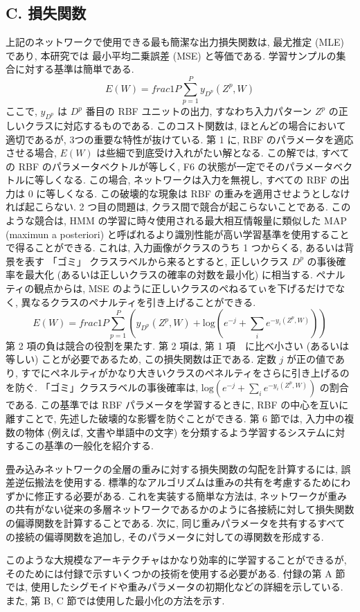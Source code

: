 \documentclass[twocolumn]{jarticle}     %
\begin{document}
\subsection{C. 損失関数}
上記のネットワークで使用できる最も簡潔な出力損失関数は, 最尤推定 (MLE) であり, 本研究では 最小平均二乗誤差 (MSE) と等価である.
学習サンプルの集合に対する基準は簡単である.
\begin{equation}
  E(W) = frac{1}{P}\sum_{p=1}^{P}y_{D^p}(Z^p,W)
\end{equation}
ここで, $y_{D^p}$ は $D^p$ 番目の RBF ユニットの出力, すなわち入力パターン $Z^p$ の正しいクラスに対応するものである.
このコスト関数は, ほとんどの場合において適切であるが, 3つの重要な特性が抜けている. 
第 1 に, RBF のパラメータを適応させる場合, $E(W)$ は些細で到底受け入れがたい解となる. この解では, すべての RBF のパラメータベクトルが等しく, F6 の状態が一定でそのパラメータベクトルに等しくなる.
この場合, ネットワークは入力を無視し, すべての RBF の出力は 0 に等しくなる. この破壊的な現象は RBF の重みを適用させようとしなければ起こらない.
 2 つ目の問題は, クラス間で競合が起こらないことである. このような競合は, HMM の学習に時々使用される最大相互情報量に類似した MAP (maximun a posteriori) と呼ばれるより識別性能が高い学習基準を使用することで得ることができる.
 これは, 入力画像がクラスのうち 1 つからくる, あるいは背景を表す 「ゴミ」 クラスラベルから来るとすると, 正しいクラス $D^p$ の事後確率を最大化 (あるいは正しいクラスの確率の対数を最小化) に相当する.
 ペナルティの観点からは, MSE のように正しいクラスのぺねるてぃを下げるだけでなく, 異なるクラスのペナルティを引き上げることができる.
 \begin{equation}
  E(W) = frac{1}{P} \sum_{p=1}^P (y_{D^p}(Z^p,W) + \mathrm{log}(e^{-j} + \sum_{i}e^{-y_i(Z^p,W)}))
 \end{equation}
 第 2 項の負は競合の役割を果たす.
 第 2 項は, 第 1 項　に比べ小さい (あるいは等しい) ことが必要であるため, この損失関数は正である.
 定数 $j$ が正の値であり, すでにペネルティがかなり大きいクラスのペネルティをさらに引き上げるのを防ぐ.
 「ゴミ」クラスラベルの事後確率は, $\mathrm{log}(e^{-j} + \sum_{i}e^{-y_i(Z^p,W)})$ の割合である.
 この基準では RBF パラメータを学習するときに, RBF の中心を互いに離すことで, 先述した破壊的な影響を防ぐことができる.
 第 6 節では, 入力中の複数の物体 (例えば, 文書や単語中の文字) を分類するよう学習するシステムに対するこの基準の一般化を紹介する.
 \par
 畳み込みネットワークの全層の重みに対する損失関数の勾配を計算するには, 誤差逆伝搬法を使用する.
 標準的なアルゴリズムは重みの共有を考慮するためにわずかに修正する必要がある. これを実装する簡単な方法は, ネットワークが重みの共有がない従来の多層ネットワークであるかのように各接続に対して損失関数の偏導関数を計算することである. 次に, 同じ重みパラメータを共有するすべての接続の偏導関数を追加し, そのパラメータに対しての導関数を形成する.
 \par
 このような大規模なアーキテクチャはかなり効率的に学習することができるが, そのためには付録で示すいくつかの技術を使用する必要がある. 付録の第 A 節では, 使用したシグモイドや重みパラメータの初期化などの詳細を示している. また, 第 B, C 節では使用した最小化の方法を示す.
\end{document}
